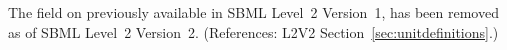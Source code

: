 The  field on \Unit previously available in SBML
Level~2 Version~1, has been removed as of SBML Level~2 Version~2.
(References: L2V2 Section~\ref{sec:unitdefinitions}.)
